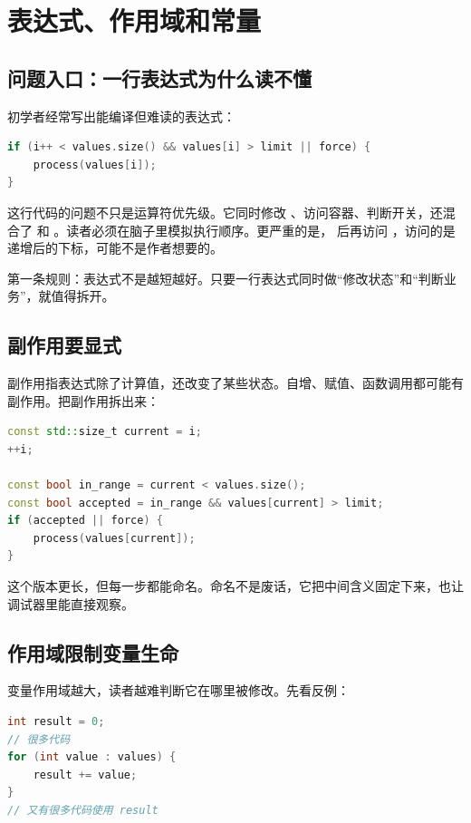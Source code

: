 \chapter{表达式、作用域和常量}

\section{问题入口：一行表达式为什么读不懂}

初学者经常写出能编译但难读的表达式：

\begin{lstlisting}[language=C++,caption={压缩过度的表达式}]
if (i++ < values.size() && values[i] > limit || force) {
    process(values[i]);
}
\end{lstlisting}

这行代码的问题不只是运算符优先级。它同时修改 、访问容器、判断开关，还混合了 \code{&&} 和 \code{||}。读者必须在脑子里模拟执行顺序。更严重的是， 后再访问 ，访问的是递增后的下标，可能不是作者想要的。

第一条规则：表达式不是越短越好。只要一行表达式同时做“修改状态”和“判断业务”，就值得拆开。

\section{副作用要显式}

副作用指表达式除了计算值，还改变了某些状态。自增、赋值、函数调用都可能有副作用。把副作用拆出来：

\begin{lstlisting}[language=C++,caption={拆开状态推进和判断}]
const std::size_t current = i;
++i;

const bool in_range = current < values.size();
const bool accepted = in_range && values[current] > limit;
if (accepted || force) {
    process(values[current]);
}
\end{lstlisting}

这个版本更长，但每一步都能命名。命名不是废话，它把中间含义固定下来，也让调试器里能直接观察。

\section{作用域限制变量生命}

变量作用域越大，读者越难判断它在哪里被修改。先看反例：

\begin{lstlisting}[language=C++,caption={变量作用域过大}]
int result = 0;
// 很多代码
for (int value : values) {
    result += value;
}
// 又有很多代码使用 result
\end{lstlisting}

